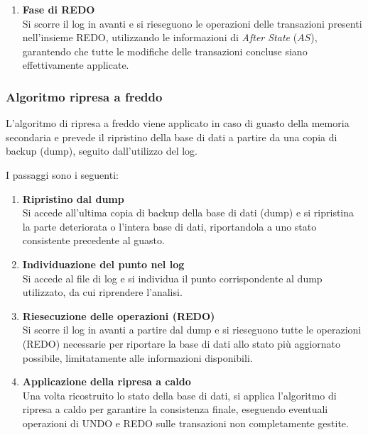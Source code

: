 \begin{enumerate}
Se la transazione appartiene a UNDO, si deve annullare l'operazione eseguendo l'operazione inversa, utilizzando le informazioni contenute nel log:

\begin{itemize}
	\item $I(T, O, AS)$ $\rightarrow$ si esegue una \textbf{DELETE} dell'oggetto $O$;
	\item $D(T, O, BS)$ $\rightarrow$ si esegue una \textbf{INSERT} dell'oggetto $O$ ripristinando lo stato precedente ($BS$);
	\item $U(T, O, BS, AS)$ $\rightarrow$ si riporta l'oggetto $O$ allo stato precedente ($BS$).
\end{itemize}

Il processo continua fino a raggiungere il record $B(T)$ della transazione più vecchia presente nell'insieme UNDO.
	
	\item \textbf{Fase di REDO} \\
	Si scorre il log in avanti e si rieseguono le operazioni delle transazioni presenti nell'insieme REDO, utilizzando le informazioni di \textit{After State} ($AS$), garantendo che tutte le modifiche delle transazioni concluse siano effettivamente applicate.
\end{enumerate}
\subsubsection{Algoritmo ripresa a freddo}
L'algoritmo di ripresa a freddo viene applicato in caso di guasto della memoria secondaria e prevede il ripristino della base di dati a partire da una copia di backup (dump), seguito dall'utilizzo del log.

I passaggi sono i seguenti:

\begin{enumerate}
	\item \textbf{Ripristino dal dump} \\
	Si accede all'ultima copia di backup della base di dati (dump) e si ripristina la parte deteriorata o l'intera base di dati, riportandola a uno stato consistente precedente al guasto.
	
	\item \textbf{Individuazione del punto nel log} \\
	Si accede al file di log e si individua il punto corrispondente al dump utilizzato, da cui riprendere l'analisi.
	
	\item \textbf{Riesecuzione delle operazioni (REDO)} \\
	Si scorre il log in avanti a partire dal dump e si rieseguono tutte le operazioni (REDO) necessarie per riportare la base di dati allo stato più aggiornato possibile, limitatamente alle informazioni disponibili.
	
	\item \textbf{Applicazione della ripresa a caldo} \\
	Una volta ricostruito lo stato della base di dati, si applica l'algoritmo di ripresa a caldo per garantire la consistenza finale, eseguendo eventuali operazioni di UNDO e REDO sulle transazioni non completamente gestite.
\end{enumerate}
